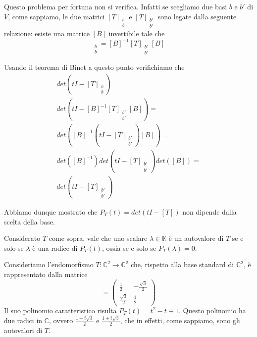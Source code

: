 Questo problema per fortuna non si verifica. Infatti se scegliamo due basi $b$ e
$b'$ di $V$, come sappiamo, le due matrici $[T]_{\substack{b \\ b}}$ e
$[T]_{\substack{b' \\ b'}}$ sono legate dalla seguente relazione: esiste una
matrice $[B]$ invertibile tale che
\begin{equation*}
	[T]_{\substack{b \\ b}} =
		[B]^{-1} [T]_{\substack{b' \\ b'}} [B]
\end{equation*}

Usando il teorema di Binet a questo punto verifichiamo che
\begin{gather*}
	det \left(tI - [T]_{\substack{b \\ b}}\right) = \\
	det \left(tI - [B]^{-1} [T]_{\substack{b' \\ b'}} [B]\right) = \\
	det \left([B]^{-1} \left(tI - [T]_{\substack{b' \\ b'}}\right) [B] \right) = \\
	det \left([B]^{-1}\right) det \left(tI - [T]_{\substack{b' \\ b'}}\right)
	det \left([B]\right) = \\
	det \left(tI - [T]_{\substack{b' \\ b'}}\right)
\end{gather*}

Abbiamo dunque mostrato che $P_T(t) = det(tI - [T])$ non dipende dalla scelta della
base.

\begin{theorem}
	Considerato $T$ come sopra, vale che uno scalare $\lambda \in \mathbb{K}$ \`e un
	autovalore di $T$ se e solo se $\lambda$ \`e una radice di $P_T(t)$, ossia se e
	solo se $P_T(\lambda) = 0$.
\end{theorem}

\begin{example}
	Consideriamo l'endomorfismo $T : \mathbb{C}^2 \to \mathbb{C}^2$ che, rispetto
	alla base standard di $\mathbb{C}^2$, \`e rappresentato dalla matrice
	\begin{equation*}
		[T] = \begin{pmatrix}
			\frac{1}{2}        & -\frac{\sqrt{3}}{2} \\
			\frac{\sqrt{3}}{2} & \frac{1}{2}
		\end{pmatrix}
	\end{equation*}
	Il suo polinomio caratteristico risulta $P_T(t) = t^2 - t + 1$. Questo polinomio
	ha due radici in $\mathbb{C}$, ovvero $\frac{1 - i\sqrt{3}}{2}$ e
	$\frac{1 + i\sqrt{3}}{2}$, che in effetti, come sappiamo, sono gli autovalori
	di $T$.
\end{example}


